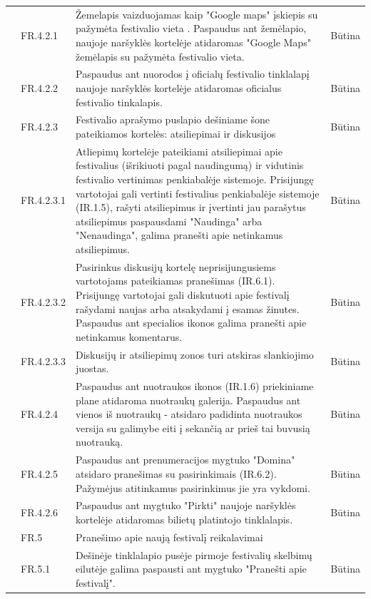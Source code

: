 \documentclass{VUMIFPSkursinis}
\begin{document}
\begin{longtable}{|p{1cm}|p{3cm}|p{9cm}|c|}
 & FR.4.2.1 & Žemelapis vaizduojamas kaip "Google maps" įskiepis su pažymėta festivalio vieta . Paspaudus ant žemėlapio, naujoje naršyklės kortelėje atidaromas "Google Maps" žemėlapis su pažymėta festivalio vieta. & Būtina \\ \cline{2-4} 
 & FR.4.2.2 & Paspaudus ant nuorodos į oficialų festivalio tinklalapį naujoje naršyklės kortelėje atidaromas oficialus festivalio tinkalapis. & Būtina \\ \cline{2-4} 
 & FR.4.2.3 & Festivalio aprašymo puslapio dešiniame šone pateikiamos kortelės: atsiliepimai ir diskusijos & Būtina \\ \cline{2-4} 
 & FR.4.2.3.1 & Atliepimų kortelėje pateikiami atsiliepimai apie festivalius (išrikiuoti pagal naudingumą) ir vidutinis festivalio vertinimas penkiabalėje sistemoje. Prisijungę vartotojai gali vertinti festivalius penkiabalėje sistemoje (IR.1.5), rašyti atsiliepimus ir įvertinti jau parašytus atsiliepimus paspausdami "Naudinga" arba "Nenaudinga", galima pranešti apie netinkamus atsiliepimus. & Būtina \\ \cline{2-4} 
 & FR.4.2.3.2 & Pasirinkus diskusijų kortelę neprisijungusiems vartotojams pateikiamas pranešimas (IR.6.1). Prisijungę vartotojai gali diskutuoti apie festivalį rašydami naujas arba atsakydami į esamas žinutes. Paspaudus ant specialios ikonos galima pranešti apie netinkamus komentarus. & Būtina \\ \cline{2-4} 
 & FR.4.2.3.3 & Diskusijų ir atsiliepimų zonos turi atskiras slankiojimo juostas. & Būtina \\ \cline{2-4} 
 & FR.4.2.4 & Paspaudus ant nuotraukos ikonos (IR.1.6) priekiniame plane atidaroma nuotraukų galerija. Paspaudus ant vienos iš nuotraukų - atsidaro padidinta nuotraukos versija su galimybe eiti į sekančią ar prieš tai buvusią nuotrauką. & Būtina \\ \cline{2-4} 
 & FR.4.2.5 & Paspaudus ant prenumeracijos mygtuko "Domina" atsidaro pranešimas su pasirinkimais (IR.6.2). Pažymėjus atitinkamus pasirinkimus jie yra vykdomi. & Būtina \\ \cline{2-4} 
 & FR.4.2.6 & Paspaudus ant mygtuko "Pirkti" naujoje naršyklės kortelėje atidaromas bilietų platintojo tinklalapis. & Būtina \\ \cline{2-4} 
 & \cellcolor{light-gray} FR.5 & \multicolumn{2}{l|}{ \cellcolor{light-gray}Pranešimo apie naują festivalį reikalavimai} \\ \cline{2-4} 
 & FR.5.1 & Dešinėje tinklalapio pusėje pirmoje festivalių skelbimų eilutėje galima paspausti ant mygtuko "Pranešti apie festivalį". & Būtina \\ \cline{2-4} 

\end{longtable}
\end{document}
